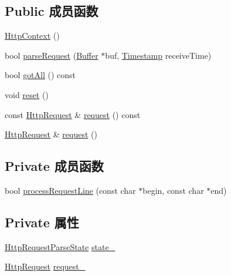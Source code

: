 \subsection*{Public 成员函数}
\begin{DoxyCompactItemize}
\item 
\hyperlink{classmuduo_1_1net_1_1HttpContext_a50a52ddd11337e5be6fe37718d315b26}{Http\+Context} ()
\item 
bool \hyperlink{classmuduo_1_1net_1_1HttpContext_a0cba53638467f64e0018aaf96dd35f61}{parse\+Request} (\hyperlink{classmuduo_1_1net_1_1Buffer}{Buffer} $\ast$buf, \hyperlink{classmuduo_1_1Timestamp}{Timestamp} receive\+Time)
\item 
bool \hyperlink{classmuduo_1_1net_1_1HttpContext_ad2febe7a65a069b4be36beac564592f3}{got\+All} () const
\item 
void \hyperlink{classmuduo_1_1net_1_1HttpContext_ad20897c5c8bd47f5d4005989bead0e55}{reset} ()
\item 
const \hyperlink{classmuduo_1_1net_1_1HttpRequest}{Http\+Request} \& \hyperlink{classmuduo_1_1net_1_1HttpContext_adb9c927b9a9aef020981b888ee01c166}{request} () const
\item 
\hyperlink{classmuduo_1_1net_1_1HttpRequest}{Http\+Request} \& \hyperlink{classmuduo_1_1net_1_1HttpContext_a0a2a13410dfd6edfe5c1bb41943bb80d}{request} ()
\end{DoxyCompactItemize}
\subsection*{Private 成员函数}
\begin{DoxyCompactItemize}
\item 
bool \hyperlink{classmuduo_1_1net_1_1HttpContext_a821b8727fba9b866e5d04d766a82e715}{process\+Request\+Line} (const char $\ast$begin, const char $\ast$end)
\end{DoxyCompactItemize}
\subsection*{Private 属性}
\begin{DoxyCompactItemize}
\item 
\hyperlink{classmuduo_1_1net_1_1HttpContext_ae45b4b16d3226e885f8f1b01481cdc97}{Http\+Request\+Parse\+State} \hyperlink{classmuduo_1_1net_1_1HttpContext_a3d9e7ad50008abb97efa5390abb349d0}{state\+\_\+}
\item 
\hyperlink{classmuduo_1_1net_1_1HttpRequest}{Http\+Request} \hyperlink{classmuduo_1_1net_1_1HttpContext_a6e50d2148d29c744bd4cafc005252a3b}{request\+\_\+}
\end{DoxyCompactItemize}
